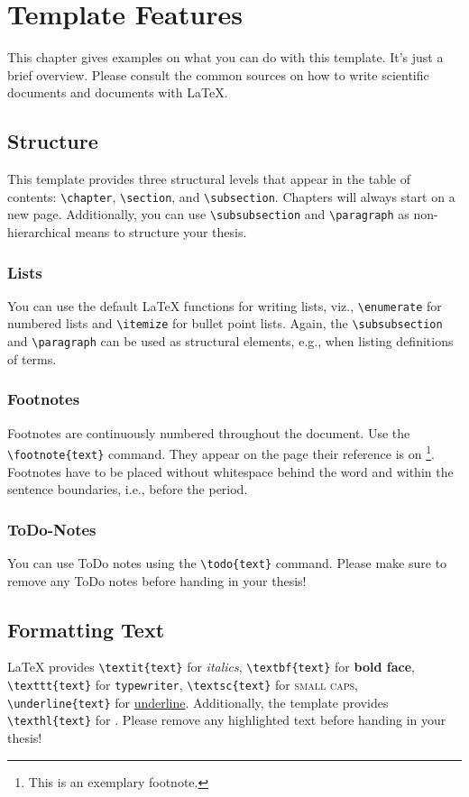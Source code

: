 \chapter{Template Features}
This chapter gives examples on what you can do with this template. It's just a brief overview. Please consult the common sources on how to write scientific documents and documents with \LaTeX.

\section{Structure}
This template provides three structural levels that appear in the table of contents: \texttt{\textbackslash chapter}, \texttt{\textbackslash section}, and \texttt{\textbackslash subsection}. Chapters will always start on a new page. Additionally, you can use \texttt{\textbackslash subsubsection} and \texttt{\textbackslash paragraph} as non-hierarchical means to structure your thesis.


\subsection{Lists}
You can use the default \LaTeX \- functions for writing lists, viz., \texttt{\textbackslash enumerate} for numbered lists and \texttt{\textbackslash itemize} for bullet point lists. Again, the \texttt{\textbackslash subsubsection} and \texttt{\textbackslash paragraph} can be used as structural elements, e.g., when listing definitions of terms.

\subsection{Footnotes}
Footnotes are continuously numbered throughout the document. Use the \texttt{\textbackslash footnote\{text\}} command.  They appear on the page their reference is on \footnote{This is an exemplary footnote.}. Footnotes have to be placed without whitespace behind the word and within the sentence boundaries, i.e., before the period.

\subsection{ToDo-Notes}
You can use ToDo notes using the \texttt{\textbackslash todo\{text\}}  command. Please make sure to remove any ToDo notes before handing in your thesis! 

\section{Formatting Text}
\LaTeX \- provides \texttt{\textbackslash textit\{text\}} for \textit{italics}, \texttt{\textbackslash textbf\{text\}} for \textbf{bold face}, \texttt{\textbackslash texttt\{text\}} for \texttt{typewriter}, \texttt{\textbackslash textsc\{text\}} for \textsc{small caps}, \texttt{\textbackslash underline\{text\}} for \underline{underline}. Additionally, the template provides  \texttt{\textbackslash texthl\{text\}} for . Please remove any highlighted text before handing in your thesis!

